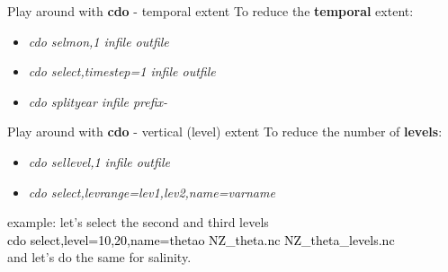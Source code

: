   
\begin{frame}{\insertsectionnumber{ |} Play around with \textbf{cdo} - temporal extent}
    To reduce the \textbf{temporal} extent:
        \vspace{0.3cm}
    \begin{itemize} 
        \item \textit{cdo selmon,1 infile outfile }
            \vspace{0.3cm}
        \item \textit{cdo select,timestep=1  infile outfile }
            \vspace{0.3cm}
         \item \textit{cdo splityear  infile prefix- }
    \end{itemize}
\end{frame}


\begin{frame}{\insertsectionnumber{ |} Play around with \textbf{cdo} - vertical (level) extent}
    To reduce the number of \textbf{levels}:\\
        \vspace{0.3cm}
    \begin{itemize}
        \item \textit{cdo sellevel,1 infile outfile }\\
            \vspace{0.3cm}
        \item \textit{cdo select,levrange=lev1,lev2,name=varname}\\
        \vspace{0.5cm}
    \end{itemize}
    example: let's select the second and third levels \\
        \vspace{0.3cm}
    \textcolor{black}{cdo select,level=10,20,name=thetao NZ\_theta.nc NZ\_theta\_levels.nc}\\
  \vspace{0.3cm}
        and let's do the same for salinity.
\end{frame}


